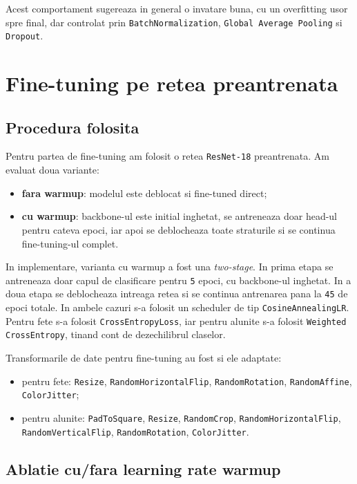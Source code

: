 \documentclass[12pt,a4paper]{article}
\begin{document}
Acest comportament sugereaza in general o invatare buna, cu un overfitting usor spre final, dar controlat prin \texttt{BatchNormalization}, \texttt{Global Average Pooling} si \texttt{Dropout}.

\section{Fine-tuning pe retea preantrenata}

\subsection{Procedura folosita}

Pentru partea de fine-tuning am folosit o retea \texttt{ResNet-18} preantrenata. Am evaluat doua variante:
\begin{itemize}
    \item \textbf{fara warmup}: modelul este deblocat si fine-tuned direct;
    \item \textbf{cu warmup}: backbone-ul este initial inghetat, se antreneaza doar head-ul pentru cateva epoci, iar apoi se deblocheaza toate straturile si se continua fine-tuning-ul complet.
\end{itemize}

In implementare, varianta cu warmup a fost una \textit{two-stage}. In prima etapa se antreneaza doar capul de clasificare pentru \texttt{5} epoci, cu backbone-ul inghetat. In a doua etapa se deblocheaza intreaga retea si se continua antrenarea pana la \texttt{45} de epoci totale. In ambele cazuri s-a folosit un scheduler de tip \texttt{CosineAnnealingLR}. Pentru fete s-a folosit \texttt{CrossEntropyLoss}, iar pentru alunite s-a folosit \texttt{Weighted CrossEntropy}, tinand cont de dezechilibrul claselor.

Transformarile de date pentru fine-tuning au fost si ele adaptate:
\begin{itemize}
    \item pentru fete: \texttt{Resize}, \texttt{RandomHorizontalFlip}, \texttt{RandomRotation}, \texttt{RandomAffine}, \texttt{ColorJitter};
    \item pentru alunite: \texttt{PadToSquare}, \texttt{Resize}, \texttt{RandomCrop}, \texttt{RandomHorizontalFlip}, \texttt{RandomVerticalFlip}, \texttt{RandomRotation}, \texttt{ColorJitter}.
\end{itemize}

\subsection{Ablatie cu/fara learning rate warmup}
\end{document}

